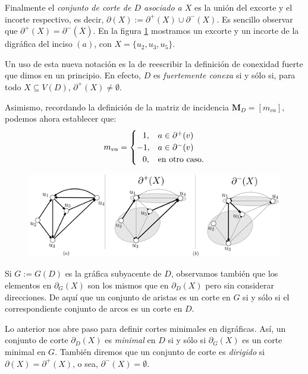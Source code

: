  Finalmente el \textit{conjunto de corte de $D$ asociado a $X$}  es la unión del excorte y el incorte respectivo, es decir, $\partial(X) := \partial^{+}(X) \cup \partial^{-}(X)$. Es sencillo observar que $\partial^{+}(X) = \partial^{-}(\overline{X})$. En la figura \ref{fig:excorteincorte} mostramos un excorte y un incorte de la digráfica del inciso $(a)$, con $X=\{u_{2},u_{3},u_{5}\}$.

 

Un uso de esta nueva notación es la de reescribir la definición de conexidad fuerte que dimos en un principio. En efecto, $D$ es \textit{fuertemente conexa} si y sólo si, para todo $X \subseteq V(D)$, $\partial^{+}(X) \neq \emptyset$. 

Asimismo, recordando la definición de la matriz de incidencia $\mathbf{M}_{D} = [m_{va}]$, podemos ahora establecer que:
\begin{equation} \label{eq:mva}
  m_{va}=
    \begin{cases}
\hspace{0.7em} 1, & a \in \partial^{+}(v)\\ 
-1, & a \in \partial^{-}(v)\\ 
\hspace{0.7em} 0, & \text{en otro caso}.
\end{cases}
\end{equation}

 \begin{figure}[H]
    \centering
\includegraphics[scale=0.18]{img/imgchapter2/ExcorteIncorte.jpg}
    \caption{}
    \label{fig:excorteincorte}
\end{figure}

Si $G:=G(D)$ es la gráfica subyacente de $D$, observamos también que los elementos en $\partial_{G}(X)$ son los mismos que en $\partial_{D}(X)$ pero sin considerar direcciones. De aquí que un conjunto de aristas es un corte en $G$ si y sólo si el correspondiente conjunto de arcos es un corte en $D$.

Lo anterior nos abre paso para definir cortes minimales en digráficas. Así, un conjunto de corte $\partial_{D}(X)$ es \textit{minimal}  en $D$ si y sólo si $\partial_{G}(X)$ es un corte minimal en $G$. También diremos que un conjunto de corte es \textit{dirigido} si $\partial(X) = \partial^{+}(X)$, o sea, $\partial^{-}(X)=\emptyset$.

